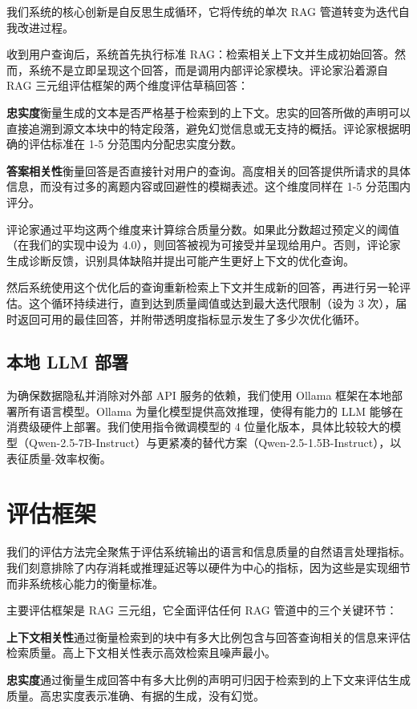 \documentclass[11pt,a4paper]{article}
\begin{document}
我们系统的核心创新是自反思生成循环，它将传统的单次 RAG 管道转变为迭代自我改进过程。

收到用户查询后，系统首先执行标准 RAG：检索相关上下文并生成初始回答。然而，系统不是立即呈现这个回答，而是调用内部评论家模块。评论家沿着源自 RAG 三元组评估框架的两个维度评估草稿回答：

\textbf{忠实度}衡量生成的文本是否严格基于检索到的上下文。忠实的回答所做的声明可以直接追溯到源文本块中的特定段落，避免幻觉信息或无支持的概括。评论家根据明确的评估标准在 1-5 分范围内分配忠实度分数。

\textbf{答案相关性}衡量回答是否直接针对用户的查询。高度相关的回答提供所请求的具体信息，而没有过多的离题内容或回避性的模糊表述。这个维度同样在 1-5 分范围内评分。

评论家通过平均这两个维度来计算综合质量分数。如果此分数超过预定义的阈值（在我们的实现中设为 4.0），则回答被视为可接受并呈现给用户。否则，评论家生成诊断反馈，识别具体缺陷并提出可能产生更好上下文的优化查询。

然后系统使用这个优化后的查询重新检索上下文并生成新的回答，再进行另一轮评估。这个循环持续进行，直到达到质量阈值或达到最大迭代限制（设为 3 次），届时返回可用的最佳回答，并附带透明度指标显示发生了多少次优化循环。

\subsection{本地 LLM 部署}

为确保数据隐私并消除对外部 API 服务的依赖，我们使用 Ollama 框架在本地部署所有语言模型。Ollama 为量化模型提供高效推理，使得有能力的 LLM 能够在消费级硬件上部署。我们使用指令微调模型的 4 位量化版本，具体比较较大的模型（Qwen-2.5-7B-Instruct）与更紧凑的替代方案（Qwen-2.5-1.5B-Instruct），以表征质量-效率权衡。

\section{评估框架}

我们的评估方法完全聚焦于评估系统输出的语言和信息质量的自然语言处理指标。我们刻意排除了内存消耗或推理延迟等以硬件为中心的指标，因为这些是实现细节而非系统核心能力的衡量标准。

主要评估框架是 RAG 三元组，它全面评估任何 RAG 管道中的三个关键环节：

\textbf{上下文相关性}通过衡量检索到的块中有多大比例包含与回答查询相关的信息来评估检索质量。高上下文相关性表示高效检索且噪声最小。

\textbf{忠实度}通过衡量生成回答中有多大比例的声明可归因于检索到的上下文来评估生成质量。高忠实度表示准确、有据的生成，没有幻觉。
\end{document}
